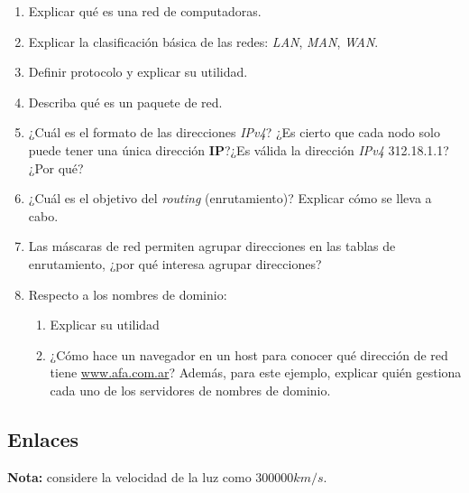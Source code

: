 \documentclass[12pt]{article}
\begin{document}
\begin{enumerate}

    \item Explicar qué es una red de computadoras.

    \item Explicar la clasificación básica de las redes: \emph{LAN},
        \emph{MAN}, \emph{WAN}.

    \item Definir protocolo y explicar su utilidad.

    \item Describa qué es un paquete de red.

    \item ¿Cuál es el formato de las direcciones \emph{IPv4}? ¿Es cierto que
        cada nodo solo puede tener una única dirección \textbf{IP}?¿Es válida
        la dirección \emph{IPv4} 312.18.1.1? ¿Por qué?

    \item ¿Cuál es el objetivo del \emph{routing} (enrutamiento)? Explicar
        cómo se lleva a cabo.

    \item Las máscaras de red permiten agrupar direcciones en las tablas de
        enrutamiento, ¿por qué interesa agrupar direcciones?

    \item Respecto a los nombres de dominio:

    \begin{enumerate}

        \item Explicar su utilidad

        \item ¿Cómo hace un navegador en un host para conocer qué dirección de
            red tiene \url{www.afa.com.ar}? Además, para este ejemplo,
            explicar quién gestiona cada uno de los servidores de nombres de
            dominio.

    \end{enumerate}

\end{enumerate}

\subsection*{Enlaces}

\textbf{Nota:} considere la velocidad de la luz como $300000 km/s$.
\end{document}
